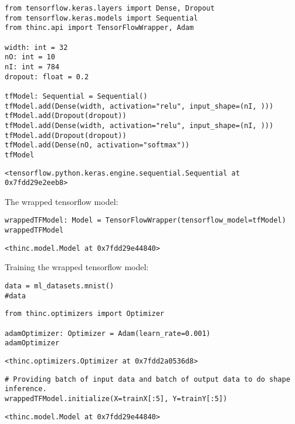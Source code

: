 \documentclass[
]{article}
\begin{document}
\begin{verbatim}
from tensorflow.keras.layers import Dense, Dropout
from tensorflow.keras.models import Sequential
from thinc.api import TensorFlowWrapper, Adam

width: int = 32
nO: int = 10
nI: int = 784
dropout: float = 0.2

tfModel: Sequential = Sequential()
tfModel.add(Dense(width, activation="relu", input_shape=(nI, )))
tfModel.add(Dropout(dropout))
tfModel.add(Dense(width, activation="relu", input_shape=(nI, )))
tfModel.add(Dropout(dropout))
tfModel.add(Dense(nO, activation="softmax"))
tfModel
\end{verbatim}

\begin{verbatim}
<tensorflow.python.keras.engine.sequential.Sequential at 0x7fdd29e2eeb8>
\end{verbatim}

The wrapped tensorflow model:

\begin{verbatim}
wrappedTFModel: Model = TensorFlowWrapper(tensorflow_model=tfModel)
wrappedTFModel
\end{verbatim}

\begin{verbatim}
<thinc.model.Model at 0x7fdd29e44840>
\end{verbatim}

Training the wrapped tensorflow model:

\begin{verbatim}
data = ml_datasets.mnist()
#data
\end{verbatim}

\begin{verbatim}
from thinc.optimizers import Optimizer

adamOptimizer: Optimizer = Adam(learn_rate=0.001)
adamOptimizer
\end{verbatim}

\begin{verbatim}
<thinc.optimizers.Optimizer at 0x7fdd2a0536d8>
\end{verbatim}

\begin{verbatim}
# Providing batch of input data and batch of output data to do shape inference.
wrappedTFModel.initialize(X=trainX[:5], Y=trainY[:5])
\end{verbatim}

\begin{verbatim}
<thinc.model.Model at 0x7fdd29e44840>
\end{verbatim}
\end{document}
